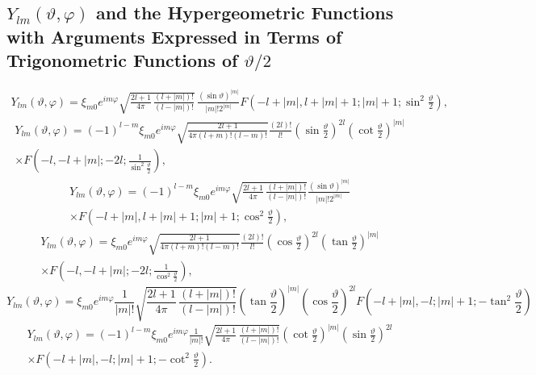 \subsection{$Y_{l m}(\vartheta, \varphi)$ and the Hypergeometric Functions with Arguments Expressed in Terms of Trigonometric Functions of $\vartheta / 2$}\label{sec:5.2.4}
\begin{fleqn}
\begin{gather}
Y_{l m}(\vartheta, \varphi)=\xi_{m 0} e^{i m \varphi} \sqrt{\frac{2 l+1}{4 \pi} \, \frac{(l+|m|)!}{(l-|m|)!}} \, \frac{(\sin \vartheta)^{|m|}}{|m|!2^{|m|}} F\left(-l+|m|, l+|m|+1 ;|m|+1 ; \sin ^{2} \frac{\vartheta}{2}\right) , \label{eq:5:2:23}
\end{gather}
\begin{multline}
Y_{l m}(\vartheta, \varphi)=  (-1)^{l-m} \xi_{m 0} e^{i m \varphi} \sqrt{\frac{2 l+1}{4 \pi(l+m)!(l-m)!}}\frac{(2 l)!}{l!}  
\left(\sin \frac{\vartheta}{2}\right)^{2 l}
\left(\cot \frac{\vartheta}{2}\right)^{|m|}\\
 \times F\left(-l,-l+|m| ;-2 l ; \frac{1}{\sin ^{2} \frac{\vartheta}{2}}\right), \label{eq:5:2:24}
\end{multline}
\begin{multline}
Y_{l m}(\vartheta, \varphi)=(-1)^{l-m} \xi_{m 0} e^{i m \varphi} \sqrt{\frac{2 l+1}{4 \pi} \, \frac{(l+|m|)!}{(l-|m|)!}} \frac{(\sin \vartheta)^{|m|}}{|m|! 2^{|m|}}  \\
\times F\left(-l+|m|, l+|m|+1 ;|m|+1 ; \cos ^{2} \frac{\vartheta}{2}\right),  \label{eq:5:2:25}
\end{multline}
\begin{multline}
Y_{l m}(\vartheta, \varphi)=\xi_{m 0} e^{i m \varphi} \sqrt{\frac{2 l+1}{4 \pi(l+m)!(l-m)!}} \frac{(2 l)!}{l!}\left(\cos \frac{\vartheta}{2}\right)^{2 l}\left(\tan \frac{\vartheta}{2}\right)^{|m|}  \label{eq:5:2:26}\\
\times F\left(-l,-l+|m| ;-2 l ; \frac{1}{\cos ^{2} \frac{\vartheta}{2}}\right),  
\end{multline}
\begin{equation}
Y_{l m}(\vartheta, \varphi)=\xi_{m 0} e^{i m \varphi} \frac{1}{|m|!}\sqrt{\frac{2 l+1}{4 \pi} \, \frac{(l+|m|)!}{(l-|m|)!}}\left(\tan \frac{\vartheta}{2}\right)^{|m|}\left(\cos \frac{\vartheta}{2}\right)^{2 l} F\left(-l+|m|,-l ;|m|+1 ;-\tan ^{2} \frac{\vartheta}{2}\right)  \label{eq:5:2:27}
\end{equation}
\begin{multline}
Y_{l m}(\vartheta, \varphi)=(-1)^{l-m} \xi_{m 0} e^{i m \varphi} \frac{1}{|m|!}\sqrt{\frac{2 l+1}{4 \pi} \, \frac{(l+|m|)!}{(l-|m|)!}}\left(\cot \frac{\vartheta}{2}\right)^{|m|}\left(\sin \frac{\vartheta}{2}\right)^{2 l}  \label{eq:5:2:28}\\
\times F\left(-l+|m|,-l ;|m|+1 ;-\cot ^{2} \frac{\vartheta}{2}\right).
\end{multline}
\end{fleqn}
